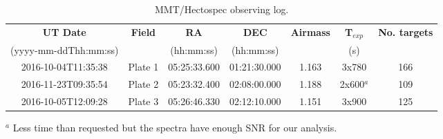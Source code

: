 \documentclass[12pt]{article}
\begin{document}
\begin{table} \scriptsize
\begin{center}
 \caption[MMT/Hectospec observing log]{MMT/Hectospec observing log.}
 \label{tab:MMT_log}
 \begin{threeparttable}
  	\setlength{\tabcolsep}{11pt}
	\begin{tabular}{ccccccc}
	\toprule
	{\bf UT Date}         & {\bf Field} & {\bf RA}     & {\bf DEC}    & {\bf Airmass} & {\bf T$_{exp}$} & {\bf No. targets} \\
	(yyyy-mm-ddThh:mm:ss) &             & (hh:mm:ss)   & (hh:mm:ss)   &               & (s)             &                   \\
	\midrule
	2016-10-04T11:35:38   & Plate 1     & 05:25:33.600 & 01:21:30.000 & 1.163         & 3x780           & 166               \\
	2016-11-23T09:35:54   & Plate 2     & 05:23:32.400 & 02:08:00.000 & 1.188         & 2x600$^a$       & 109               \\
	2016-10-05T12:09:28   & Plate 3     & 05:26:46.330 & 02:12:10.000 & 1.151         & 3x900           & 125               \\
	\bottomrule
	\end{tabular}
	\begin{tablenotes}
	  $^a$ Less time than requested but the spectra have enough SNR for our analysis.\\
	\end{tablenotes}
 \end{threeparttable}
\end{center}
\end{table}
\end{document}
